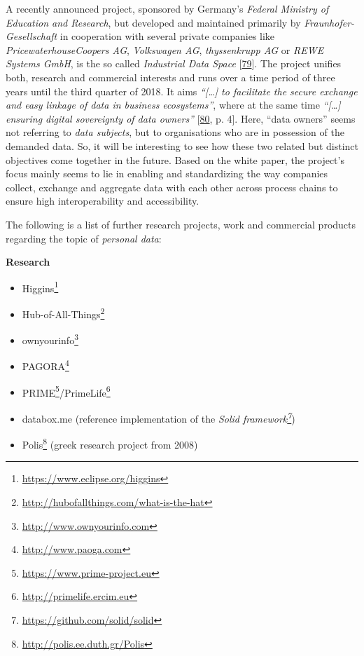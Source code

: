 \documentclass[12pt,english,a4paper,titlepage,cleardoublepage=empty,dottedtoc]{report}
\renewcommand{\href}[2]{#2\footnote{\url{#1}}}
\providecommand{\tightlist}{%
  \setlength{\itemsep}{0pt}\setlength{\parskip}{0pt}}
\begin{document}
A recently announced project, sponsored by Germany's \emph{Federal
Ministry of Education and Research}, but developed and maintained
primarily by \emph{Fraunhofer-Gesellschaft} in cooperation with several
private companies like \emph{PricewaterhouseCoopers AG},
\emph{Volkswagen AG}, \emph{thyssenkrupp AG} or \emph{REWE Systems
GmbH}, is the so called \emph{Industrial Data Space}
{[}\protect\hyperlink{ref-web_industrial-data-space}{79}{]}. The project
unifies both, research and commercial interests and runs over a time
period of three years until the third quarter of 2018. It aims
\emph{``{[}\ldots{}{]} to facilitate the secure exchange and easy
linkage of data in business ecosystems''}, where at the same time
\emph{``{[}\ldots{}{]} ensuring digital sovereignty of data owners''}
{[}\protect\hyperlink{ref-whitepaper_2016_industrial-data-space}{80}, p.
4{]}. Here, ``data owners'' seems not referring to \emph{data subjects},
but to organisations who are in possession of the demanded data. So, it
will be interesting to see how these two related but distinct objectives
come together in the future. Based on the white paper, the project's
focus mainly seems to lie in enabling and standardizing the way
companies collect, exchange and aggregate data with each other across
process chains to ensure high interoperability and accessibility.

\newpage

The following is a list of further research projects, work and
commercial products regarding the topic of \emph{personal data}:

\textbf{Research}

\begin{itemize}
\tightlist
\item
  \href{https://www.eclipse.org/higgins}{Higgins}
\item
  \href{http://hubofallthings.com/what-is-the-hat}{Hub-of-All-Things}
\item
  \href{http://www.ownyourinfo.com}{ownyourinfo}
\item
  \href{http://www.paoga.com}{PAGORA}
\item
  \href{https://www.prime-project.eu}{PRIME}/\href{http://primelife.ercim.eu}{PrimeLife}
\item
  databox.me (reference implementation of the
  \emph{\href{https://github.com/solid/solid}{Solid framework}})
\item
  \href{http://polis.ee.duth.gr/Polis}{Polis} (greek research project
  from 2008)
\end{itemize}
\end{document}
